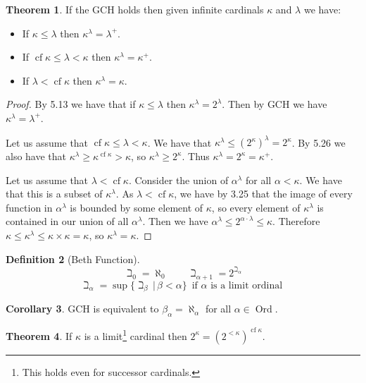 \documentclass{article}
\theoremstyle{definition}
\newtheorem{thm}{Theorem}[section]
\newtheorem{crly}[thm]{Corollary}
\newtheorem{defn}[thm]{Definition}
\DeclareMathOperator{\Ord}{Ord}
\DeclareMathOperator{\cf}{cf}
\begin{document}
\begin{thm}
    If the GCH holds then given infinite cardinals $\kappa$ and $\lambda$ we have:
    \begin{itemize}
        \item If $\kappa \le \lambda$ then $\kappa^\lambda = \lambda^+$.
        \item If $\cf \kappa \le \lambda < \kappa$ then $\kappa^\lambda = \kappa^+$.
        \item If $\lambda < \cf \kappa$ then $\kappa^\lambda = \kappa$.
    \end{itemize}
\end{thm}

\begin{proof}
    By 5.13 we have that if $\kappa \le \lambda$ then $\kappa^\lambda = 2^\lambda$. Then by GCH we have $\kappa^\lambda = \lambda^+$.

    Let us assume that $\cf \kappa \le \lambda < \kappa$. We have that $\kappa^\lambda \le (2^\kappa)^\lambda = 2^\kappa$. By 5.26 we also have that $\kappa^{\lambda} \ge \kappa^{\cf \kappa} > \kappa$, so $\kappa^\lambda \ge 2^\kappa$. Thus $\kappa^\lambda = 2^\kappa = \kappa^+$.

    Let us assume that $\lambda < \cf \kappa$. Consider the union of $\alpha^\lambda$ for all $\alpha < \kappa$. We have that this is a subset of $\kappa^\lambda$. As $\lambda < \cf \kappa$, we have by 3.25 that the image of every function in $\alpha^\lambda$ is bounded by some element of $\kappa$, so every element of $\kappa^\lambda$ is contained in our union of all $\alpha^\lambda$. Then we have $\alpha^\lambda \le 2^{\alpha \cdot \lambda} \le \kappa$. Therefore $\kappa \le \kappa^\lambda \le \kappa \times \kappa = \kappa$, so $\kappa^\lambda = \kappa$.
\end{proof}

\begin{defn}[Beth Function]
    \[
        \beth_0 = \aleph_0 \quad\quad \beth_{\alpha + 1} = 2^{\beth_\alpha}
    \]
    \[
        \beth_{\alpha} = \sup\{ \beth_\beta \, | \, \beta < \alpha \} \, \text{ if $\alpha$ is a limit ordinal }
    \]
\end{defn}

\begin{crly}
    GCH is equivalent to $\beta_{\alpha} = \aleph_\alpha$ for all $\alpha \in \Ord$.
\end{crly}

\begin{thm}
    If $\kappa$ is a limit\footnote{This holds even for successor cardinals.} cardinal then $2^\kappa = (2^{<\kappa})^{\cf \kappa}$. 
\end{thm}
\end{document}
